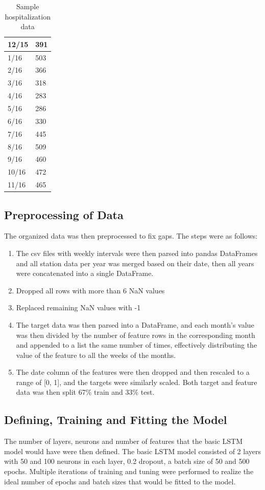 \documentclass[10pt,11pt,12pt,oneside]{book}
\begin{document}
\begin{table}[H]
{\begin{tabular}{|l|l|}
\hline
12/15 & 391     \\
\hline
1/16  & 503     \\
\hline
2/16  & 366     \\
\hline
3/16  & 318     \\
\hline
4/16  & 283     \\
\hline
5/16  & 286     \\
\hline
6/16  & 330     \\
\hline
7/16  & 445     \\
\hline
8/16  & 509     \\
\hline
9/16  & 460     \\
\hline
10/16 & 472     \\
\hline
11/16 & 465     \\
\hline

\end{tabular}
\caption{Sample hospitalization data}
\label{table:data_csv2}
}
\end{table}

    \subsection{Preprocessing of Data}
    The organized data was then preprocessed to fix gaps. The steps were as follows:
    \begin{enumerate}
        \item The csv files with weekly intervals were then parsed into pandas DataFrames and all station data per year was merged based on their date, then all years were concatenated into a single DataFrame.
        \item Dropped all rows with more than 6 NaN values
        \item Replaced remaining NaN values with -1
        \item The target data was then parsed into a DataFrame, and each month's value was then divided by the number of feature rows in the corresponding month and appended
to a list the same number of times, effectively distributing the value of the feature to all the weeks of the months.
        \item The date column of the features were then dropped and then rescaled to a range of [0, 1], and the targets were similarly scaled. Both target and feature data was then split 67\% train and 33\%  test. 
    \end{enumerate}
    \subsection{Defining, Training and Fitting the Model}
    The number of layers, neurons and number of features that the basic LSTM model would have were then defined. The basic LSTM model consisted of 2 layers with 50 and 100 neurons in each layer, 0.2 dropout, a batch size of 50 and 500 epochs. Multiple iterations of training and tuning were performed to realize the ideal number of epochs and batch sizes that would be fitted to the model.
\end{document}
